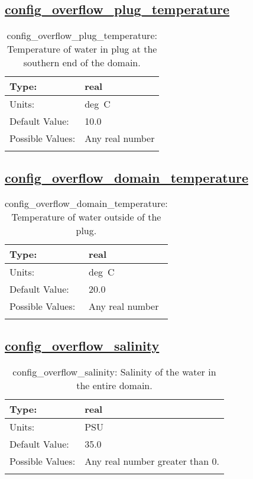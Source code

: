 \subsection[config\_overflow\_plug\_temperature]{\hyperref[sec:nm_tab_overflow]{config\_overflow\_plug\_temperature}}
\label{subsec:nm_sec_config_overflow_plug_temperature}
\begin{center}
\begin{longtable}{| p{2.0in} || p{4.0in} |}
    \hline
    Type: & real \\
    \hline
    Units: & \si{deg.C} \\
    \hline
    Default Value: & 10.0 \\
    \hline
    Possible Values: & Any real number \\
    \hline
    \caption{config\_overflow\_plug\_temperature: Temperature of water in plug at the southern end of the domain.}
\end{longtable}
\end{center}
\subsection[config\_overflow\_domain\_temperature]{\hyperref[sec:nm_tab_overflow]{config\_overflow\_domain\_temperature}}
\label{subsec:nm_sec_config_overflow_domain_temperature}
\begin{center}
\begin{longtable}{| p{2.0in} || p{4.0in} |}
    \hline
    Type: & real \\
    \hline
    Units: & \si{deg.C} \\
    \hline
    Default Value: & 20.0 \\
    \hline
    Possible Values: & Any real number \\
    \hline
    \caption{config\_overflow\_domain\_temperature: Temperature of water outside of the plug.}
\end{longtable}
\end{center}
\subsection[config\_overflow\_salinity]{\hyperref[sec:nm_tab_overflow]{config\_overflow\_salinity}}
\label{subsec:nm_sec_config_overflow_salinity}
\begin{center}
\begin{longtable}{| p{2.0in} || p{4.0in} |}
    \hline
    Type: & real \\
    \hline
    Units: & \si{PSU} \\
    \hline
    Default Value: & 35.0 \\
    \hline
    Possible Values: & Any real number greater than 0. \\
    \hline
    \caption{config\_overflow\_salinity: Salinity of the water in the entire domain.}
\end{longtable}
\end{center}
